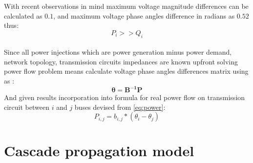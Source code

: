 \documentclass[twoside]{iisthesis}
\begin{document}
With recent observations in mind maximum voltage magnitude differences can be calculated as \(0.1\), and maximum voltage phase angles difference in radians as \(0.52\) thus:
\begin{equation}\label{eq:real_bigger}
	P_{i}>> Q_{i}
\end{equation}
\\
Since all power injections which are power generation minus power demand, network topology, transmission circuits impedances are known upfront solving power flow problem means calculate voltage phase angles differences matrix using as :
\[
	\mathbf{\theta} = \mathbf{B^{-1}}\mathbf{P}
\]
And given results incorporation into formula for real power flow on transmission circuit between  \(i\) and \(j\) buses devised from \eqref{eq:power}:
\[
P_{i,j} = b_{i,j}*(\theta_{i} - \theta_{j})
\]

\section{Cascade propagation model}
\end{document}
